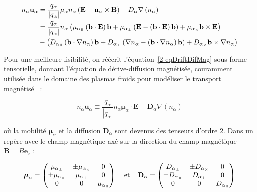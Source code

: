 \begin{refsection}
\begin{equation}
\label{2-eqDriftDifMag}
\begin{split}
n_\alpha\mathbf u_\alpha&=\frac{q_\alpha}{|q_\alpha|}\mu_\alpha
n_\alpha\left(\mathbf E+\mathbf u_\alpha\times\mathbf
B\right)-D_\alpha\nabla\left( n_\alpha\right)
\\
&=\frac{q_\alpha}{|q_\alpha|} n_\alpha\left(\mu_{\alpha_\para}\left(\mathbf
b\cdot\mathbf E\right)\mathbf b+\mu_{\alpha_\perp}\left(\mathbf
E-\left(\mathbf
b\cdot\mathbf E\right)\mathbf
b\right)+\mu_{\alpha_\times}\mathbf
b\times\mathbf E\right)
\\
&-\left(D_{\alpha_\para}\left(\mathbf
b\cdot\nabla n_\alpha\right)\mathbf b+D_{\alpha_\perp}\left(\mathbf
\nabla n_\alpha-\left(\mathbf
b\cdot\nabla n_\alpha\right)\mathbf
b\right)+D_{\alpha_\times}\mathbf
b\times\mathbf \nabla n_\alpha\right)
\end{split}
\end{equation}

Pour une meilleure lisibilité, on réécrit l'équation~\ref{2-eqDriftDifMag}
sous forme tensorielle, donnant l'équation de dérive-diffusion magnétisée,
couramment utilisée dans le domaine des plasmas froids pour modéliser le
transport magnétisé~\parencite{grephe, propulseur} :

\begin{equation}
\label{2-eqDriftDifMag2}
n_\alpha\mathbf u_\alpha\equiv
\frac{q_\alpha}{|q_\alpha|} n_\alpha\boldsymbol{\mu}_\alpha\cdot \mathbf
E-\mathbf{D}_\alpha{\nabla\left( n_\alpha\right)}
\end{equation}

où la mobilité $\boldsymbol{\mu}_\alpha$ et la diffusion $\mathbf{D}_\alpha$
sont devenus des tenseurs d'ordre 2. Dans un repère avec le champ magnétique axé
sur la direction du champ magnétique $\mathbf B=B\mathbf e_z$ :

\begin{align}
\boldsymbol{\mu}_\alpha =
 \begin{pmatrix}
  \mu_{\alpha_\perp} & \pm\mu_{\alpha_\times} & 0 \\
  \pm\mu_{\alpha_\times} & \mu_{\alpha_\perp} & 0 \\
  0  & 0  & \mu_{\alpha_\para} 
 \end{pmatrix}\;\;\;\;\text{et}\;\;\;\;
 \mathbf D_\alpha =
 \begin{pmatrix}
  D_{\alpha_\perp} & \pm D_{\alpha_\times} & 0 \\
 \pm D_{\alpha_\times} & D_{\alpha_\perp} & 0 \\
  0  & 0  & D_{\alpha_\para} 
 \end{pmatrix}
\end{align}


\end{refsection}
